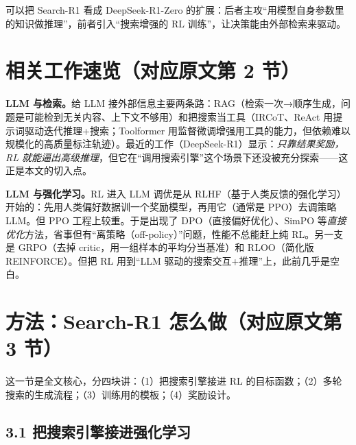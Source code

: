 \documentclass[11pt,UTF8,fontset=fandol]{ctexart}
\begin{document}
可以把 Search-R1 看成 DeepSeek-R1-Zero 的扩展：后者主攻“用模型自身参数里的知识做推理”，前者引入“搜索增强的 RL 训练”，让决策能由外部检索来驱动。

\section{相关工作速览（对应原文第 2 节）}

\textbf{LLM 与检索。}\quad 给 LLM 接外部信息主要两条路：RAG（检索一次→顺序生成，问题是可能检到无关内容、上下文不够用）和把搜索当工具（IRCoT、ReAct 用提示词驱动迭代推理+搜索；Toolformer 用监督微调增强用工具的能力，但依赖难以规模化的高质量标注轨迹）。最近的工作（DeepSeek-R1）显示：\emph{只靠结果奖励，RL 就能逼出高级推理}，但它在“调用搜索引擎”这个场景下还没被充分探索——这正是本文的切入点。

\textbf{LLM 与强化学习。}\quad RL 进入 LLM 调优是从 RLHF（基于人类反馈的强化学习）开始的：先用人类偏好数据训一个奖励模型，再用它（通常是 PPO）去调策略 LLM。但 PPO 工程上较重。于是出现了 DPO（直接偏好优化）、SimPO 等\emph{直接优化}方法，省事但有“离策略（off-policy）”问题，性能不总能赶上纯 RL。另一支是 GRPO（去掉 critic，用一组样本的平均分当基准）和 RLOO（简化版 REINFORCE）。但把 RL 用到“LLM 驱动的搜索交互+推理”上，此前几乎是空白。

\section{方法：Search-R1 怎么做（对应原文第 3 节）}

这一节是全文核心，分四块讲：（1）把搜索引擎接进 RL 的目标函数；（2）多轮搜索的生成流程；（3）训练用的模板；（4）奖励设计。

\subsection{3.1 把搜索引擎接进强化学习}
\end{document}
